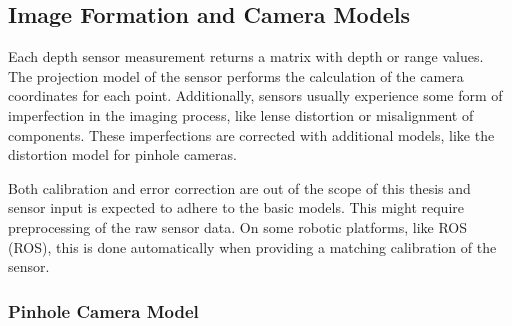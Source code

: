 \subsection{Image Formation and Camera Models}

Each depth sensor measurement returns a matrix with depth or range values.
The projection model of the sensor performs the calculation of the camera coordinates for each point.
Additionally, sensors usually experience some form of imperfection in the imaging process, like lense distortion or misalignment of components.
These imperfections are corrected with additional models, like the distortion model for pinhole cameras.

Both calibration and error correction are out of the scope of this thesis and sensor input is expected to adhere to the basic models.
This might require preprocessing of the raw sensor data.
On some robotic platforms, like \acrshort{ROS} (\acrlong{ROS}), this is done automatically when providing a matching calibration of the sensor.

\subsubsection{Pinhole Camera Model}\label{sec:pinhole_model}

